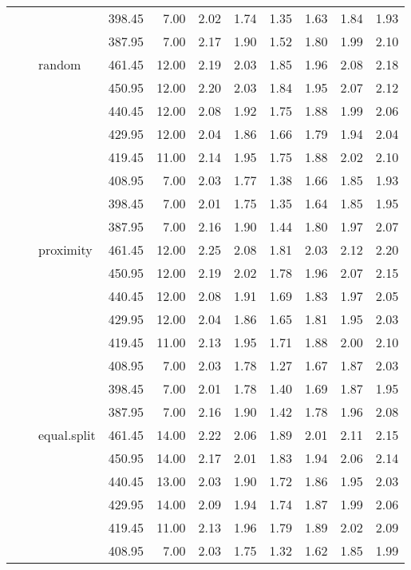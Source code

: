 \begin{longtable}{llllrrrrrrr}
   &  &  & 398.45 & 7.00 & 2.02 & 1.74 & 1.35 & 1.63 & 1.84 & 1.93 \\ 
   &  &  & 387.95 & 7.00 & 2.17 & 1.90 & 1.52 & 1.80 & 1.99 & 2.10 \\ 
   &  & random & 461.45 & 12.00 & 2.19 & 2.03 & 1.85 & 1.96 & 2.08 & 2.18 \\ 
   &  &  & 450.95 & 12.00 & 2.20 & 2.03 & 1.84 & 1.95 & 2.07 & 2.12 \\ 
   &  &  & 440.45 & 12.00 & 2.08 & 1.92 & 1.75 & 1.88 & 1.99 & 2.06 \\ 
   &  &  & 429.95 & 12.00 & 2.04 & 1.86 & 1.66 & 1.79 & 1.94 & 2.04 \\ 
   &  &  & 419.45 & 11.00 & 2.14 & 1.95 & 1.75 & 1.88 & 2.02 & 2.10 \\ 
   &  &  & 408.95 & 7.00 & 2.03 & 1.77 & 1.38 & 1.66 & 1.85 & 1.93 \\ 
   &  &  & 398.45 & 7.00 & 2.01 & 1.75 & 1.35 & 1.64 & 1.85 & 1.95 \\ 
   &  &  & 387.95 & 7.00 & 2.16 & 1.90 & 1.44 & 1.80 & 1.97 & 2.07 \\ 
   &  & proximity & 461.45 & 12.00 & 2.25 & 2.08 & 1.81 & 2.03 & 2.12 & 2.20 \\ 
   &  &  & 450.95 & 12.00 & 2.19 & 2.02 & 1.78 & 1.96 & 2.07 & 2.15 \\ 
   &  &  & 440.45 & 12.00 & 2.08 & 1.91 & 1.69 & 1.83 & 1.97 & 2.05 \\ 
   &  &  & 429.95 & 12.00 & 2.04 & 1.86 & 1.65 & 1.81 & 1.95 & 2.03 \\ 
   &  &  & 419.45 & 11.00 & 2.13 & 1.95 & 1.71 & 1.88 & 2.00 & 2.10 \\ 
   &  &  & 408.95 & 7.00 & 2.03 & 1.78 & 1.27 & 1.67 & 1.87 & 2.03 \\ 
   &  &  & 398.45 & 7.00 & 2.01 & 1.78 & 1.40 & 1.69 & 1.87 & 1.95 \\ 
   &  &  & 387.95 & 7.00 & 2.16 & 1.90 & 1.42 & 1.78 & 1.96 & 2.08 \\ 
   &  & equal.split & 461.45 & 14.00 & 2.22 & 2.06 & 1.89 & 2.01 & 2.11 & 2.15 \\ 
   &  &  & 450.95 & 14.00 & 2.17 & 2.01 & 1.83 & 1.94 & 2.06 & 2.14 \\ 
   &  &  & 440.45 & 13.00 & 2.03 & 1.90 & 1.72 & 1.86 & 1.95 & 2.03 \\ 
   &  &  & 429.95 & 14.00 & 2.09 & 1.94 & 1.74 & 1.87 & 1.99 & 2.06 \\ 
   &  &  & 419.45 & 11.00 & 2.13 & 1.96 & 1.79 & 1.89 & 2.02 & 2.09 \\ 
   &  &  & 408.95 & 7.00 & 2.03 & 1.75 & 1.32 & 1.62 & 1.85 & 1.99 \\ 

\end{longtable}
